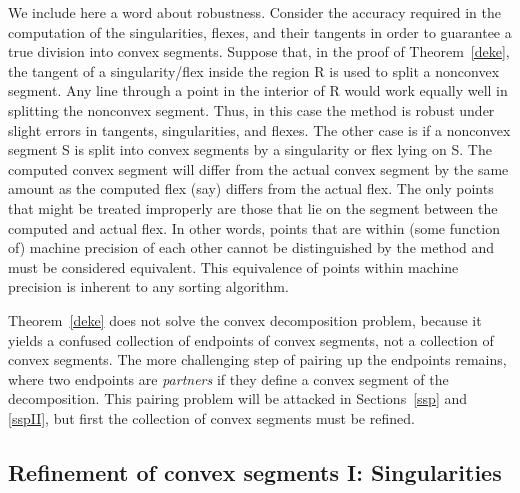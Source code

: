 We include here a word about robustness.
Consider the accuracy required in the computation of the singularities, flexes, 
and their tangents in order to guarantee a true division into convex segments.
Suppose that, in the proof of Theorem~\ref{deke}, the tangent of a 
singularity/flex inside the region R is used to split a nonconvex segment.
Any line through a point in the interior of R would work equally well in splitting
the nonconvex segment.
Thus, in this case the method is robust under slight errors in tangents, singularities,
and flexes.
The other case is if a nonconvex segment S is split into convex segments by a 
singularity or flex lying on S. 
The computed convex segment will differ from the actual convex segment by the same
amount as the computed flex (say) differs from the actual flex.
The only points that might be treated improperly are those that lie on the segment
between the computed and actual flex.
In other words, points that are within (some function of) machine precision 
of each other cannot be distinguished by the method and must be considered 
equivalent.
This equivalence of points within machine precision is inherent to any sorting 
algorithm.

Theorem~\ref{deke} does not solve the convex decomposition problem,
because it yields a confused collection of endpoints of convex segments, 
not a collection of convex segments.
The more challenging step of pairing up the endpoints remains, where
two endpoints are {\em partners} if they define a convex segment of the 
decomposition.
This pairing problem will be attacked in Sections~\ref{ssp} 
and \ref{sspII}, but first the collection of convex segments must be 
refined.

\subsection{Refinement of convex segments I: Singularities}
\label{sec-refine1}

